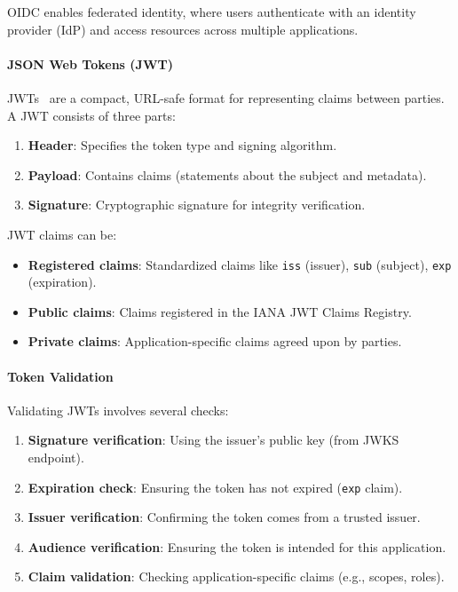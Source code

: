 \documentclass[a4paper,twoside]{sapthesis}
\begin{document}
OIDC enables federated identity, where users authenticate with an identity provider (IdP) and access resources across multiple applications.

\paragraph{JSON Web Tokens (JWT)}

JWTs~\cite{rfc7519jwt}
are a compact, URL-safe format for representing claims between parties. A JWT consists of three parts:

\begin{enumerate}
    \item \textbf{Header}: Specifies the token type and signing algorithm.
    \item \textbf{Payload}: Contains claims (statements about the subject and metadata).
    \item \textbf{Signature}: Cryptographic signature for integrity verification.
\end{enumerate}

JWT claims can be:
\begin{itemize}
    \item \textbf{Registered claims}: Standardized claims like \texttt{iss} (issuer), \texttt{sub} (subject), \texttt{exp} (expiration).
    \item \textbf{Public claims}: Claims registered in the IANA JWT Claims Registry.
    \item \textbf{Private claims}: Application-specific claims agreed upon by parties.
\end{itemize}

\paragraph{Token Validation}

Validating JWTs involves several checks:

\begin{enumerate}
    \item \textbf{Signature verification}: Using the issuer's public key (from JWKS endpoint).
    \item \textbf{Expiration check}: Ensuring the token has not expired (\texttt{exp} claim).
    \item \textbf{Issuer verification}: Confirming the token comes from a trusted issuer.
    \item \textbf{Audience verification}: Ensuring the token is intended for this application.
    \item \textbf{Claim validation}: Checking application-specific claims (e.g., scopes, roles).
\end{enumerate}
\end{document}
